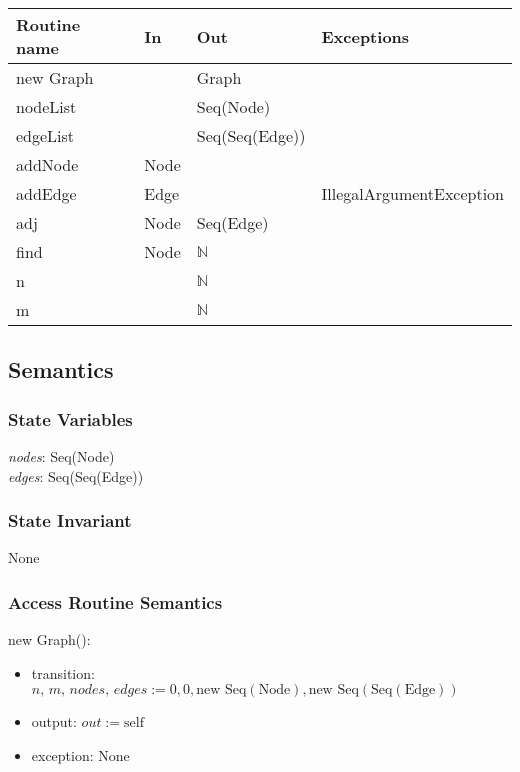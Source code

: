 \documentclass[12pt]{article}
\begin{document}
\begin{tabular}{| l | l | l | l |}
	\hline
	\textbf{Routine name} & \textbf{In} & \textbf{Out} & \textbf{Exceptions}\\
	\hline
	new Graph & ~ & Graph & ~\\
	\hline
	nodeList & ~ & Seq(Node) & ~\\
	\hline
	edgeList & ~ & Seq(Seq(Edge)) & ~\\
	\hline
	addNode & Node & ~ & ~\\
	\hline
	addEdge & Edge & ~ & IllegalArgumentException\\
	\hline
	adj & Node & Seq(Edge) & ~\\
	\hline
	find & Node & $\mathbb{N}$ & ~\\
	\hline
	n & ~ & $\mathbb{N}$ & ~\\
	\hline
	m & ~ & $\mathbb{N}$ & ~\\
	\hline
\end{tabular}

\subsection*{Semantics}

\subsubsection*{State Variables}

\textit{nodes}: Seq(Node) \\
\textit{edges}: Seq(Seq(Edge)) 

\subsubsection*{State Invariant}

None

\subsubsection*{Access Routine Semantics}

\noindent new Graph():
\begin{itemize}
	\item transition: $\textit{n, m, nodes, edges} := 0, 0, \mbox{new Seq}(\mbox{Node}), \mbox{new Seq}(\mbox{Seq}(\mbox{Edge}))$
	\item output: $out := \mbox{self}$
	\item exception: None
\end{itemize}
\end{document}
